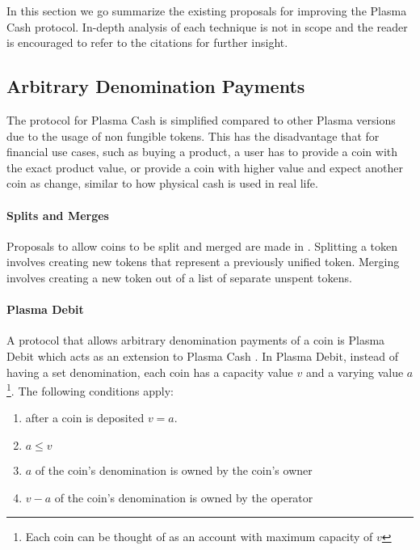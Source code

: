 In this section we go summarize the existing proposals for improving the Plasma
Cash protocol. In-depth analysis of each technique is not in scope and the
reader is encouraged to refer to the citations for further insight.

\subsection{Arbitrary Denomination Payments}

The protocol for Plasma Cash is simplified compared to other Plasma versions
due to the usage of non fungible tokens. This has the disadvantage that for financial use cases, such as buying a product, a user has to provide a coin with the exact product
value, or provide a coin with higher value and expect another coin as change,
similar to how physical cash is used in real life. 

\paragraph{Splits and Merges} Proposals to allow coins to be split and merged are made in  \cite{xuanji_split_merge, dan_split_merge}. Splitting a token involves creating new tokens that
represent a previously unified token. 
Merging involves creating a new token out of a list of separate unspent tokens.

\paragraph{Plasma Debit} A protocol that allows arbitrary denomination payments of a coin is Plasma
Debit which acts as an extension to Plasma Cash \cite{plasma_debit}. In Plasma
Debit, instead of having a set denomination, each coin has a capacity value $v$
and a varying value $a$\footnote{Each coin can be thought of as an account with maximum capacity of $v$}. The following conditions apply:

\begin{enumerate}
    \item after a coin is deposited $v = a$.
    \item $a \leq v$
    \item $a$ of the coin's denomination is owned by the coin's owner
    \item $v - a$ of the coin's denomination is owned by the operator
\end{enumerate}


